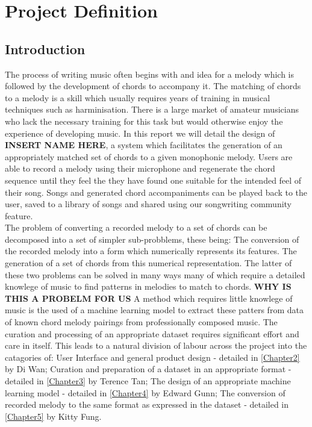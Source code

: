 
\chapter{Project Definition} %

\label{Chapter1} %


\section{Introduction}

The process of writing music often begins with and idea for a melody which is followed by the development of chords to accompany it.
The matching of chords to a melody is a skill which usually requires years of training in musical techniques such as harminisation.
There is a large market of amateur musicians who lack the necessary training for this task but would otherwise enjoy the experience of developing music.  
In this report we will detail the design of \textbf{INSERT NAME HERE}, a system which facilitates the generation of an appropriately matched set of chords to a given monophonic melody.
Users are able to record a melody using their microphone and regenerate the chord sequence until they feel the they have found one suitable for the intended feel of their song.
Songs and generated chord accompaniments can be played back to the user, saved to a library of songs and shared using our songwriting community feature. \\
The problem of converting a recorded melody to a set of chords can be decomposed into a set of simpler sub-probblems, these being:
The conversion of the recorded melody into a form which numerically represents its features. 
The generation of a set of chords from this numerical representation.
The latter of these two problems can be solved in many ways many of which require a detailed knowlege of music to find patterns in melodies to match to chords.  
\textbf{WHY IS THIS A PROBELM FOR US}
A method which requires little knowlege of music is the used of a machine learning model to extract these patters from data of known chord melody pairings from professionally composed music. 
The curation and processing of an appropriate dataset requires significant effort and care in itself.
This leads to a natural division of labour across the project into the catagories of:
User Interface and general product design - detailed in \ref{Chapter2} by Di Wan;
Curation and preparation of a dataset in an appropriate format - detailed in \ref{Chapter3} by Terence Tan;
The design of an appropriate machine learning model - detailed in \ref{Chapter4} by Edward Gunn;
The conversion of recorded melody to the same format as expressed in the dataset - detailed in \ref{Chapter5} by Kitty Fung.


